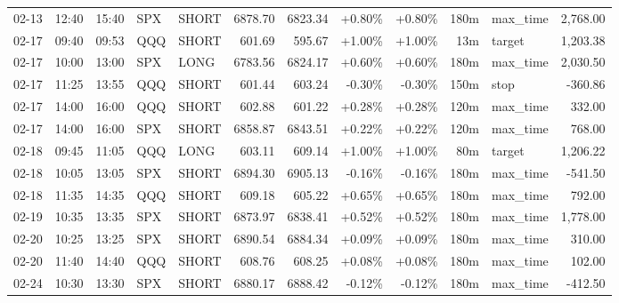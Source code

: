 \documentclass[11pt,a4paper]{article}
\begin{document}
\begin{center}
\begin{longtable}{>{\color{txtmain}}l l l l l r r r r r >{\color{txtmain}}l r}
02-13 & 12:40 & 15:40 & SPX & SHORT & 6878.70 & 6823.34 & \textcolor{wingreen}{+0.80\%} & \textcolor{wingreen}{+0.80\%} & 180m & max\_time & \textcolor{wingreen}{2,768.00} \\
02-17 & 09:40 & 09:53 & QQQ & SHORT & 601.69 & 595.67 & \textcolor{wingreen}{+1.00\%} & \textcolor{wingreen}{+1.00\%} & 13m & target & \textcolor{wingreen}{1,203.38} \\
02-17 & 10:00 & 13:00 & SPX & LONG & 6783.56 & 6824.17 & \textcolor{wingreen}{+0.60\%} & \textcolor{wingreen}{+0.60\%} & 180m & max\_time & \textcolor{wingreen}{2,030.50} \\
02-17 & 11:25 & 13:55 & QQQ & SHORT & 601.44 & 603.24 & \textcolor{lossred}{-0.30\%} & \textcolor{lossred}{-0.30\%} & 150m & stop & \textcolor{lossred}{-360.86} \\
02-17 & 14:00 & 16:00 & QQQ & SHORT & 602.88 & 601.22 & \textcolor{wingreen}{+0.28\%} & \textcolor{wingreen}{+0.28\%} & 120m & max\_time & \textcolor{wingreen}{332.00} \\
02-17 & 14:00 & 16:00 & SPX & SHORT & 6858.87 & 6843.51 & \textcolor{wingreen}{+0.22\%} & \textcolor{wingreen}{+0.22\%} & 120m & max\_time & \textcolor{wingreen}{768.00} \\
02-18 & 09:45 & 11:05 & QQQ & LONG & 603.11 & 609.14 & \textcolor{wingreen}{+1.00\%} & \textcolor{wingreen}{+1.00\%} & 80m & target & \textcolor{wingreen}{1,206.22} \\
02-18 & 10:05 & 13:05 & SPX & SHORT & 6894.30 & 6905.13 & \textcolor{lossred}{-0.16\%} & \textcolor{lossred}{-0.16\%} & 180m & max\_time & \textcolor{lossred}{-541.50} \\
02-18 & 11:35 & 14:35 & QQQ & SHORT & 609.18 & 605.22 & \textcolor{wingreen}{+0.65\%} & \textcolor{wingreen}{+0.65\%} & 180m & max\_time & \textcolor{wingreen}{792.00} \\
02-19 & 10:35 & 13:35 & SPX & SHORT & 6873.97 & 6838.41 & \textcolor{wingreen}{+0.52\%} & \textcolor{wingreen}{+0.52\%} & 180m & max\_time & \textcolor{wingreen}{1,778.00} \\
02-20 & 10:25 & 13:25 & SPX & SHORT & 6890.54 & 6884.34 & \textcolor{wingreen}{+0.09\%} & \textcolor{wingreen}{+0.09\%} & 180m & max\_time & \textcolor{wingreen}{310.00} \\
02-20 & 11:40 & 14:40 & QQQ & SHORT & 608.76 & 608.25 & \textcolor{wingreen}{+0.08\%} & \textcolor{wingreen}{+0.08\%} & 180m & max\_time & \textcolor{wingreen}{102.00} \\
02-24 & 10:30 & 13:30 & SPX & SHORT & 6880.17 & 6888.42 & \textcolor{lossred}{-0.12\%} & \textcolor{lossred}{-0.12\%} & 180m & max\_time & \textcolor{lossred}{-412.50} \\

\end{longtable}
\end{center}
\end{document}
